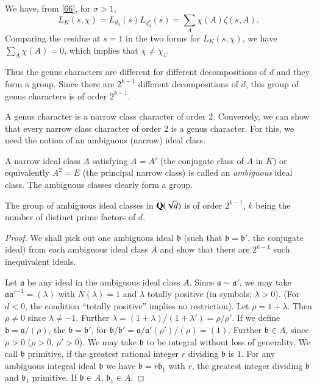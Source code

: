 We have, from \eqref{66}, for $\sigma>1$,
$$
L_{K}(s,\chi)=L_{d_{3}}(s)L_{d^{\ast}_{3}}(s)=\sum_{A}\chi(A)\zeta(s,A).
$$
Comparing the residue at $s=1$ in the two forms for $L_{K}(s,\chi)$,
we have $\sum\limits_{A}\chi(A)=0$, which implies that $\chi\neq
\chi_{1}$.

Thus the genus characters are different for different decompositions
of $d$ and they form a group. Since there are $2^{k-1}$ different
decompositions of $d$, this group of genus characters is of order
$2^{k-1}$.

A genus character is a narrow class character of order
$2$. Conversely, we can show that every narrow class character of
order $2$ is a genus character. For this, we need the notion of an
ambiguous (narrow) ideal class.

A narrow ideal class $A$ satisfying $A=A'$ (the conjugate class of $A$
in $K$) or equivalently $A^{2}=E$ (the principal narrow class) is
called an {\em ambiguous} ideal class. The ambiguous classes clearly
form a group.

\begin{proposition}\label{prop12}
The group of ambiguous ideal classes in $\mathbf{Q}(\sqrt{d})$ is of order
$2^{k-1}$, $k$ being the number of distinct prime factors of $d$.
\end{proposition}

\begin{proof}
We shall pick out one ambiguous ideal $\mathfrak{b}$ (\ie such that
$\mathfrak{b}=\mathfrak{b}'$, the conjugate ideal) from each ambiguous
ideal class $A$ and show that there are $2^{k-1}$ such inequivalent
ideals.

Let $\mathfrak{a}$ be any ideal in the ambiguous ideal class
$A$. Since $\mathfrak{a}\sim \mathfrak{a}'$, we may take
$\mathfrak{a}{\mathfrak{a}'}^{-1}=(\lambda)$ with $N(\lambda)=1$ and
$\lambda$ totally positive (in symbols; $\lambda>0$). (For $d<0$, the
condition ``totally positive'' implies no restriction). Let
$\rho=1+\lambda$. Then $\rho\neq 0$ since $\lambda\neq -1$. Further
$\lambda=(1+\lambda)/(1+\lambda')=\rho/\rho'$. If we define
$\mathfrak{b}=\mathfrak{a}/(\rho)$, the $\mathfrak{b}=\mathfrak{b}'$,
for
$\mathfrak{b}/\mathfrak{b}'=\mathfrak{a}/\mathfrak{a}'(\rho')/(\rho)=(1)$. Further
$\mathfrak{b}\in A$, since $\rho>0$ (\ie $\rho>0$, $\rho'>0$). We may
take $\mathfrak{b}$ to be integral without loss of generality. We call
$\mathfrak{b}$ primitive, if the greatest rational integer $r$
dividing $\mathfrak{b}$ is $1$. For any ambiguous integral ideal
$\mathfrak{b}$ we have $\mathfrak{b}=r\mathfrak{b}_{1}$ with $r$, the
greatest integer dividing $\mathfrak{b}$ and $\mathfrak{b}_{1}$
primitive. If $\mathfrak{b}\in A$, $\mathfrak{b}_{1}\in A$.
\end{proof}

